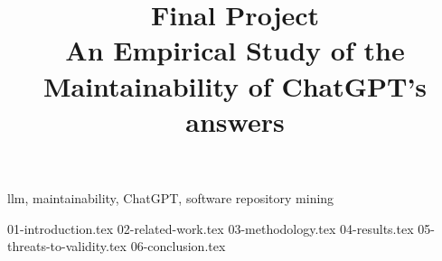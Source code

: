 \documentclass[conference]{IEEEtran}
\begin{document}
\title{Final Project\\
{\footnotesize An Empirical Study of the Maintainability of ChatGPT's answers}
}

\author{
}

\maketitle

\begin{abstract}
\end{abstract}

\begin{IEEEkeywords}
    llm, maintainability, ChatGPT, software repository mining
\end{IEEEkeywords}


{01-introduction.tex}
{02-related-work.tex}
{03-methodology.tex}
{04-results.tex}
{05-threats-to-validity.tex}
{06-conclusion.tex}


\begin{thebibliography}{00}
\end{thebibliography}
\end{document}
